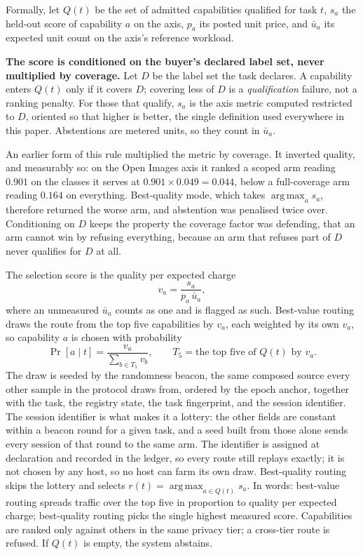\documentclass[11pt]{article}
\DeclareMathOperator{\argmax}{arg\,max}
\begin{document}
Formally, let $Q(t)$ be the set of admitted capabilities
qualified for task $t$, $s_a$ the held-out score of capability
$a$ on the axis, $p_a$ its posted unit price, and $\bar u_a$ its
expected unit count on the axis's reference workload.

\textbf{The score is conditioned on the buyer's declared label
    set, never multiplied by coverage.} Let $D$ be the label set the
task declares. A capability enters $Q(t)$ only if it covers $D$;
covering less of $D$ is a \emph{qualification} failure, not a
ranking penalty. For those that qualify, $s_a$ is the axis metric
computed restricted to $D$, oriented so that higher is better,
the single definition used everywhere in this paper. Abstentions are
metered units, so they count in $\bar u_a$.

An earlier form of this rule multiplied the metric by coverage.
It inverted quality, and measurably so: on the Open Images axis it
ranked a scoped arm reading $0.901$ on the classes it serves at
$0.901 \times 0.049 = 0.044$, below a full-coverage arm reading
$0.164$ on everything. Best-quality mode, which takes $\argmax_a s_a$,
therefore returned the worse arm, and abstention was penalised
twice over. Conditioning on $D$ keeps the property the coverage
factor was defending, that an arm cannot win by refusing
everything, because an arm that refuses part of $D$ never
qualifies for $D$ at all.

The selection score is the quality per expected charge
\begin{equation}
    v_a = \frac{s_a}{p_a \, \bar u_a},
\end{equation}
where an unmeasured $\bar u_a$ counts as one and is flagged as
such. Best-value routing draws the route from the top five
capabilities by $v_a$, each weighted by its own $v_a$, so
capability $a$ is chosen with probability
\begin{equation}
    \Pr[a \mid t] = \frac{v_a}{\sum_{b \in T_5} v_b},
    \qquad
    T_5 = \text{the top five of } Q(t) \text{ by } v_a.
\end{equation}
The draw is seeded by the randomness beacon, the same composed
source every other sample in the protocol draws from, ordered
by the epoch anchor, together with the task, the registry state,
the task fingerprint, and the session identifier. The session
identifier is what makes it a lottery: the other fields are
constant within a beacon round for a given task, and a seed
built from those alone sends every session of that round to the
same arm. The identifier is assigned at declaration and recorded
in the ledger, so every route still replays exactly; it is not
chosen by any host, so no host can farm its own draw. Best-quality routing skips the
lottery and selects $r(t) = \argmax_{a \in Q(t)} s_a$. In words:
best-value routing spreads traffic over the top five in
proportion to quality per expected charge; best-quality routing
picks the single highest measured score. Capabilities are ranked
only against others in the same privacy tier; a cross-tier route
is refused. If $Q(t)$ is empty, the
system abstains.
\end{document}
